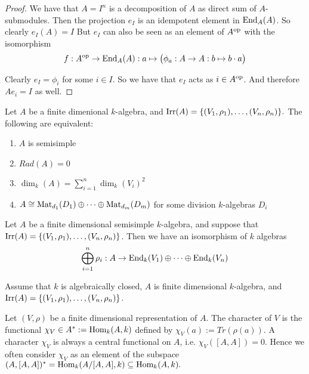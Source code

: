 \begin{proof}
We have that \(A=I^n\) is a decomposition of \(A\) as direct sum of \(A\)-submodules. Then the projection \(e_I\) is an idempotent element in \(\operatorname{End}_A(A)\). So clearly \(e_I(A)=I\) But \(e_I\) can also be seen as an element of \(A^{\operatorname{op}}\) with the isomorphism
\[
f :A^{\operatorname{op}} \rightarrow  \operatorname{End}_{A} (A) : a \mapsto \big(\phi _{a} : A \rightarrow  A:b \mapsto b\cdot a\big)
\]

Clearly \(e_I=\phi _{i}\) for some \(i\in I\). So we have that \(e_I\) acts as $i\in A^{\operatorname{op}}$. And therefore \(Ae_{i}=I\) as well.
\end{proof}
\newpage
\begin{thm}
Let \(A\) be a finite dimenional \(k\)-algebra, and \(\operatorname{Irr}(A)=\{(V_{1},\rho _{1}),\ldots ,(V_{n},\rho _{n})\}.\) The following are equivalent:

\begin{enumerate}
  \item \(A\) is semisimple
  \item \(Rad(A)=0\)
  \item \(\dim_{k}(A)=\sum _{i=1}^n \dim_{k}(V_{i})^{2}\)
  \item \(A\cong \operatorname{Mat}_{d_{1}}(D_{1})\oplus \cdots \oplus \operatorname{Mat}_{d_{m}}(D_{m})\) for some division \(k\)-algebras \(D_{i}\)
\end{enumerate}
\end{thm}


\begin{thm}
Let \(A\) be a finite dimensional semisimple \(k\)-algebra, and suppose that \(\operatorname{Irr}(A)=\{(V_{1},\rho _{1}),\ldots ,(V_{n},\rho _{n})\}\). Then we have an isomorphism of \(k\) algebras
\[
\bigoplus_{i=1}^n\rho _{i} : A\rightarrow \operatorname{End}_{k}(V_{1})\oplus \cdots \oplus \operatorname{End}_{k}(V_{n})
\]
\end{thm}

Assume that \(k\) is algebraically closed, \(A\) is finite dimensional \(k\)-algebra, and \(\operatorname{Irr}(A)=\{(V_{1},\rho _{1}),\ldots ,(V_{n},\rho _{n})\}\).

\begin{defn}
Let \((V,\rho )\) be a finite dimensional representation of \(A\). The character of \(V\) is the functional \(\chi _V\in A^*:=\operatorname{Hom}_{k}(A,k)\) defined by \(\chi _V(a):=Tr(\rho (a)).\) A character \(\chi _V\) is always a central functional on \(A\), i.e. \(\chi _V([A,A])=0.\) Hence we often consider \(\chi _V\) as an element of the subspace \((A,[A,A])^*=\operatorname{Hom}_{k}(A/[A,A],k)\subseteq \operatorname{Hom}_{k}(A,k).\)
\end{defn}

